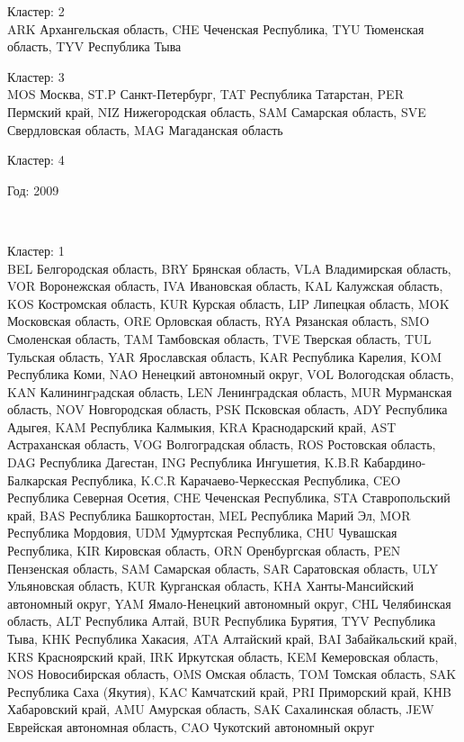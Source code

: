 \documentclass[11pt]{article}
\begin{document}
Кластер:  2 \\
ARK Архангельская область, CHE Чеченская Республика, TYU Тюменская область, TYV Республика Тыва

Кластер:  3 \\
MOS Москва, ST.P Санкт-Петербург, TAT Республика Татарстан, PER Пермский край, NIZ Нижегородская область, SAM Самарская область, SVE Свердловская область, MAG Магаданская область

Кластер:  4 \\

\begin{center}
Год:  2009
\end{center}


    \begin{center}
    \end{center}
    { \hspace*{\fill} \\}
    

Кластер:  1 \\
BEL Белгородская область, BRY Брянская область, VLA Владимирская область, VOR Воронежская область, IVA Ивановская область, KAL Калужская область, KOS Костромская область, KUR Курская область, LIP Липецкая область, MOK Московская область, ORE Орловская область, RYA Рязанская область, SMO Смоленская область, TAM Тамбовская область, TVE Тверская область, TUL Тульская область, YAR Ярославская область, KAR Республика Карелия, KOM Республика Коми, NAO Ненецкий автономный округ, VOL Вологодская область, KAN Калинингpадская область, LEN Ленинградская область, MUR Мурманская область, NOV Новгородская область, PSK Псковская область, ADY Республика Адыгея, KAM Республика Калмыкия, KRA Краснодарский край, AST Астраханская область, VOG Волгоградская область, ROS Ростовская область, DAG Республика Дагестан, ING Республика Ингушетия, K.B.R Кабардино-Балкарская Республика, K.C.R Карачаево-Черкесская Республика, CEO Республика Северная Осетия, CHE Чеченская Республика, STA Ставропольский край, BAS Республика Башкортостан, MEL Республика Марий Эл, MOR Республика Мордовия, UDM Удмуртская Республика, CHU Чувашская Республика, KIR Кировская область, ORN Оренбургская область, PEN Пензенская область, SAM Самарская область, SAR Саратовская область, ULY Ульяновская область, KUR Курганская область, KHA Ханты-Мансийский автономный округ, YAM Ямало-Ненецкий автономный округ, CHL Челябинская область, ALT Республика Алтай, BUR Республика Бурятия, TYV Республика Тыва, KHK Республика Хакасия, ATA Алтайский край, BAI Забайкальский край, KRS Красноярский край, IRK Иркутская область, KEM Кемеровская область, NOS Новосибирская область, OMS Омская область, TOM Томская область, SAK Республика Саха (Якутия), KAC Камчатский край, PRI Приморский край, KHB Хабаровский край, AMU Амурская область, SAK Сахалинская область, JEW Еврейская автономная область, CAO Чукотский автономный округ
\end{document}
